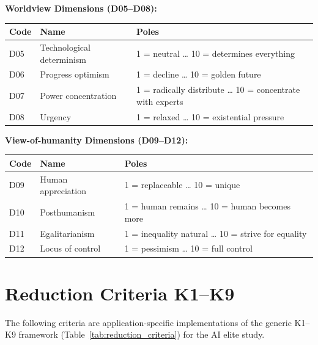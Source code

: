 \documentclass[11pt,a4paper]{article}
\theoremstyle{definition}
\theoremstyle{plain}
\theoremstyle{remark}
\begin{document}
\bigskip
\noindent\textbf{Worldview Dimensions (D05--D08):}

\begin{tabularx}{\textwidth}{l l X}
  \toprule
  \textbf{Code} & \textbf{Name} & \textbf{Poles} \\
  \midrule
  D05 & Technological determinism & 1 = neutral \ldots{} 10 = determines everything \\
  D06 & Progress optimism & 1 = decline \ldots{} 10 = golden future \\
  D07 & Power concentration & 1 = radically distribute \ldots{} 10 = concentrate with experts \\
  D08 & Urgency & 1 = relaxed \ldots{} 10 = existential pressure \\
  \bottomrule
\end{tabularx}

\bigskip
\noindent\textbf{View-of-humanity Dimensions (D09--D12):}

\begin{tabularx}{\textwidth}{l l X}
  \toprule
  \textbf{Code} & \textbf{Name} & \textbf{Poles} \\
  \midrule
  D09 & Human appreciation & 1 = replaceable \ldots{} 10 = unique \\
  D10 & Posthumanism & 1 = human remains \ldots{} 10 = human becomes more \\
  D11 & Egalitarianism & 1 = inequality natural \ldots{} 10 = strive for equality \\
  D12 & Locus of control & 1 = pessimism \ldots{} 10 = full control \\
  \bottomrule
\end{tabularx}


\section{Reduction Criteria K1--K9}
\label{app:reduktion}

The following criteria are application-specific implementations of the generic K1--K9 framework (Table~\ref{tab:reduction_criteria}) for the AI elite study.
\end{document}
